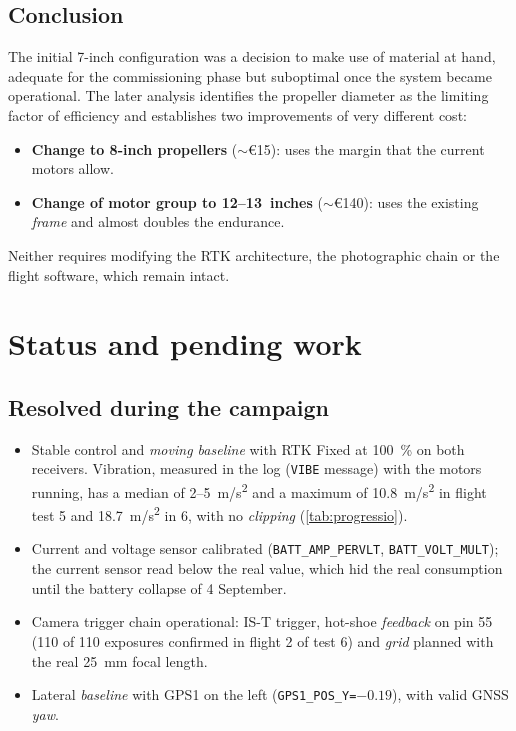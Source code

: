 \subsection{Conclusion}

The initial 7-inch configuration was a decision to make use of material at hand, adequate for the commissioning phase but suboptimal once the system became operational. The later analysis identifies the propeller diameter as the limiting factor of efficiency and establishes two improvements of very different cost:

\begin{itemize}
    \item \textbf{Change to 8-inch propellers} ($\sim$€15): uses the margin that the current motors allow.
    \item \textbf{Change of motor group to 12--13~inches} ($\sim$€140): uses the existing \emph{frame} and almost doubles the endurance.
\end{itemize}

Neither requires modifying the RTK architecture, the photographic chain or the flight software, which remain intact.


\section{Status and pending work}
\label{sec:pendents-proves-vol}

\subsection{Resolved during the campaign}
\begin{itemize}
    \item Stable control and \emph{moving baseline} with RTK Fixed at 100~\% on both receivers. Vibration, measured in the log (\texttt{VIBE} message) with the motors running, has a median of 2--5~m/s\textsuperscript{2} and a maximum of 10.8~m/s\textsuperscript{2} in flight test 5 and 18.7~m/s\textsuperscript{2} in 6, with no \emph{clipping} (\cref{tab:progressio}).
    \item Current and voltage sensor calibrated (\texttt{BATT\_AMP\_PERVLT}, \texttt{BATT\_VOLT\_MULT}); the current sensor read below the real value, which hid the real consumption until the battery collapse of 4 September.
    \item Camera trigger chain operational: IS-T trigger, hot-shoe \emph{feedback} on pin 55 (110 of 110 exposures confirmed in flight 2 of test 6) and \emph{grid} planned with the real 25~mm focal length.
    \item Lateral \emph{baseline} with GPS1 on the left (\texttt{GPS1\_POS\_Y=$-0.19$}), with valid GNSS \emph{yaw}.
\end{itemize}

